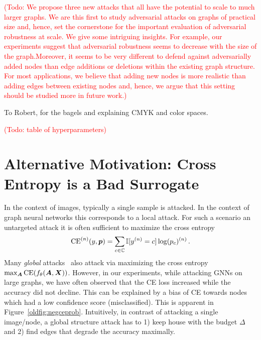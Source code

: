 \documentclass[sigconf,authordraft]{acmart}
\newcommand{\adj}{\mA}
\newcommand{\features}{\mX}
\newcommand{\todo}[1]{\textcolor{red}{(Todo: #1)}}
\begin{document}
\todo{We propose three new attacks that all have the potential to scale to much larger graphs. We are this first to study adversarial attacks on graphs of practical size and, hence, set the cornerstone for the important evaluation of adversarial robustness at scale. We give some intriguing insights. For example, our experiments suggest that adversarial robustness seems to decrease with the size of the graph.Moreover, it seems to be very different to defend against adversarially added nodes than edge additions or deletions within the existing graph structure. For most applications, we believe that adding new nodes is more realistic than adding edges between existing nodes and, hence, we argue that this setting should be studied more in future work.}

\begin{acks}
  To Robert, for the bagels and explaining CMYK and color spaces.
\end{acks}




\newpage
\appendix

\todo{table of hyperparameters}

\section{Alternative Motivation: Cross Entropy is a Bad Surrogate}\label{sec:related} %

In the context of images, typically a single sample is attacked. In the context of graph neural networks this corresponds to a local attack. For such a scenario an untargeted attack it is often sufficient to maximize the cross entropy 
\begin{equation}\label{oldeq:crossentropy}
\text{CE}^{(n)}(y, {\bm{p}}) = \sum_{c \in {\mathbb{C}}} \mathbb{I}[y^{(n)} = c] \log({p}_{c})^{(n)}\,.
\end{equation}
Many \emph{global} attacks~\citet{Chen2018, Wu2019, Xu2018, Zugner2019a} also attack via maximizing the cross entropy \(\max_{\adj} \text{CE}(f_{\theta}(\adj, \features))\). However, in our experiments, while attacking GNNs on large graphs, we have often observed that the CE loss increased while the accuracy did not decline. This can be explained by a bias of CE towards nodes which had a low confidence score (misclassified). This is apparent in Figure~\ref{oldfig:negceprob}. Intuitively, in contrast of attacking a single image/node, a global structure attack has to 1) keep house with the budget \(\Delta\) and 2) find edges that degrade the accuracy maximally.
\end{document}
